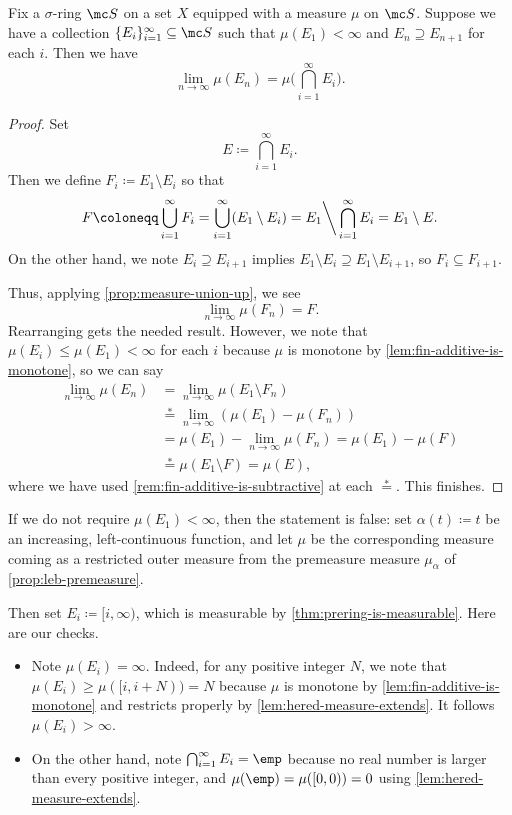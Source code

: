 \documentclass[../notes.tex]{subfiles}
\begin{document}
\begin{cor}
	Fix a $\sigma$-ring $\mc S$ on a set $X$ equipped with a measure $\mu$ on $\mc S$. Suppose we have a collection $\{E_i\}_{i=1}^\infty\subseteq\mc S$ such that $\mu(E_1)<\infty$ and $E_n\supseteq E_{n+1}$ for each $i$. Then we have
	\[\lim_{n\to\infty}\mu(E_n)=\mu\Bigg(\bigcap_{i=1}^\infty E_i\Bigg).\]
\end{cor}
\begin{proof}
	Set
	\[E\coloneqq\bigcap_{i=1}^\infty E_i.\]
	Then we define $F_i\coloneqq E_1\setminus E_i$ so that
	\[F\coloneqq\bigcup_{i=1}^\infty F_i=\bigcup_{i=1}^\infty(E_1\setminus E_i)=E_1{\mathbin\bigg\backslash}\bigcap_{i=1}^\infty E_i=E_1\setminus E.\]
	On the other hand, we note $E_i\supseteq E_{i+1}$ implies $E_1\setminus E_i\supseteq E_1\setminus E_{i+1}$, so $F_i\subseteq F_{i+1}$.

	Thus, applying \autoref{prop:measure-union-up}, we see
	\[\lim_{n\to\infty}\mu(F_n)=F.\]
	Rearranging gets the needed result. However, we note that $\mu(E_i)\le\mu(E_1)<\infty$ for each $i$ because $\mu$ is monotone by \autoref{lem:fin-additive-is-monotone}, so we can say
	\begin{align*}
		\lim_{n\to\infty}\mu(E_n) &= \lim_{n\to\infty}\mu(E_1\setminus F_n) \\
		&\stackrel*= \lim_{n\to\infty}(\mu(E_1)-\mu(F_n)) \\
		&= \mu(E_1)-\lim_{n\to\infty}\mu(F_n)=\mu(E_1)-\mu(F) \\
		&\stackrel*= \mu(E_1\setminus F)=\mu(E),
	\end{align*}
	where we have used \autoref{rem:fin-additive-is-subtractive} at each $\stackrel*=$. This finishes.
\end{proof}
\begin{remark}
	If we do not require $\mu(E_1)<\infty$, then the statement is false: set $\alpha(t)\coloneqq t$ be an increasing, left-continuous function, and let $\mu$ be the corresponding measure coming as a restricted outer measure from the premeasure measure $\mu_\alpha$ of \autoref{prop:leb-premeasure}.
	
	Then set $E_i\coloneqq[i,\infty)$, which is measurable by \autoref{thm:prering-is-measurable}. Here are our checks.
	\begin{itemize}
		\item Note $\mu(E_i)=\infty$. Indeed, for any positive integer $N$, we note that $\mu(E_i)\ge\mu([i,i+N))=N$ because $\mu$ is monotone by \autoref{lem:fin-additive-is-monotone} and restricts properly by \autoref{lem:hered-measure-extends}. It follows $\mu(E_i)>\infty$.
		\item On the other hand, note $\bigcap_{i=1}^\infty E_i=\emp$ because no real number is larger than every positive integer, and $\mu(\emp)=\mu([0,0))=0$ using \autoref{lem:hered-measure-extends}.
	\end{itemize}
\end{remark}
\end{document}
